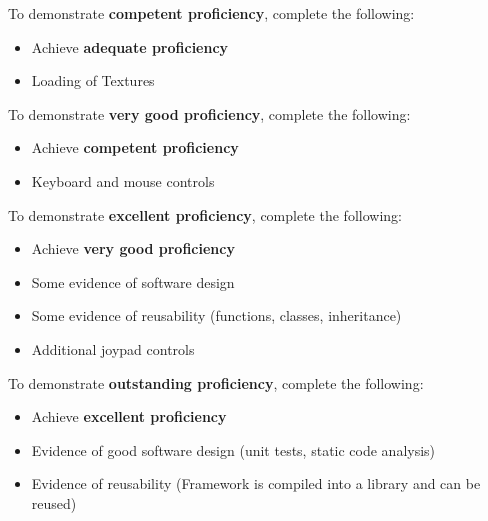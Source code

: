 \documentclass{../../../fal_assignment}
\begin{document}
To demonstrate \textbf{competent proficiency}, complete the following:
\begin{itemize}
	\item Achieve \textbf{adequate proficiency}
	\item Loading of Textures
\end{itemize}

To demonstrate \textbf{very good proficiency}, complete the following:
\begin{itemize}
	\item Achieve \textbf{competent proficiency}
	\item Keyboard and mouse controls
\end{itemize}

To demonstrate \textbf{excellent proficiency}, complete the following:
\begin{itemize}
	\item Achieve \textbf{very good proficiency}
	\item Some evidence of software design
	\item Some evidence of reusability (functions, classes, inheritance) 
	\item Additional joypad controls
\end{itemize}

To demonstrate \textbf{outstanding proficiency}, complete the following:
\begin{itemize}
	\item Achieve \textbf{excellent proficiency}
	\item Evidence of good software design (unit tests, static code analysis)
	\item Evidence of reusability (Framework is compiled into a library and can be reused)
\end{itemize}
\end{document}
